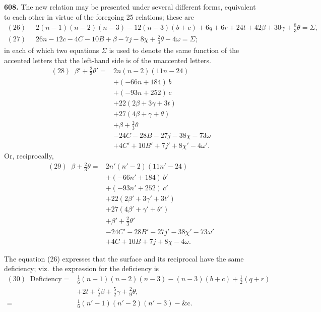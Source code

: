 \documentclass[11pt,a4paper]{article}
\newcommand{\artno}[1]{\textbf{#1.}\quad}
\begin{document}
\artno{608} The new relation may be presented under several different forms,
equivalent to each other in virtue of the foregoing 25 relations; these are
\begin{align*}
  (26)\;\; & 2(n-1)(n-2)(n-3) - 12(n-3)(b+c)
            + 6q + 6r + 24t + 42\beta + 30\gamma + \tfrac{8}{3}\theta = \Sigma, \\
  (27)\;\; & 26n - 12c - 4C - 10B + \beta - 7j - 8\chi
            + \tfrac{2}{3}\theta - 4\omega = \Sigma;
\end{align*}
in each of which two equations $\Sigma$ is used to denote the same function
of the accented letters that the left-hand side is of the unaccented letters.
\begin{align*}
  (28)\;\; \beta' + \tfrac{2}{3}\theta' = {} & 2n(n-2)(11n - 24) \\
       & + (-66n + 184)\,b \\
       & + (-93n + 252)\,c \\
       & + 22(2\beta + 3\gamma + 3t) \\
       & + 27(4\beta + \gamma + \theta) \\
       & + \beta + \tfrac{2}{3}\theta \\
       & - 24C - 28B - 27j - 38\chi - 73\omega \\
       & + 4C' + 10B' + 7j' + 8\chi' - 4\omega'.
\end{align*}
Or, reciprocally,
\begin{align*}
  (29)\;\; \beta + \tfrac{2}{3}\theta = {} & 2n'(n'-2)(11n' - 24) \\
       & + (-66n' + 184)\,b' \\
       & + (-93n' + 252)\,c' \\
       & + 22(2\beta' + 3\gamma' + 3t') \\
       & + 27(4\beta' + \gamma' + \theta') \\
       & + \beta' + \tfrac{2}{3}\theta' \\
       & - 24C' - 28B' - 27j' - 38\chi' - 73\omega' \\
       & + 4C + 10B + 7j + 8\chi - 4\omega.
\end{align*}

The equation (26) expresses that the surface and its reciprocal have the same
deficiency; viz.\ the expression for the deficiency is
\begin{align*}
  (30)\;\; \text{Deficiency} = {} & \tfrac{1}{6}(n-1)(n-2)(n-3)
        - (n-3)(b+c) + \tfrac{1}{2}(q+r) \\
       & + 2t + \tfrac{7}{2}\beta + \tfrac{5}{2}\gamma + \tfrac{2}{9}\theta, \\
   = {} & \tfrac{1}{6}(n'-1)(n'-2)(n'-3) - \&\text{c}.
\end{align*}
\end{document}
